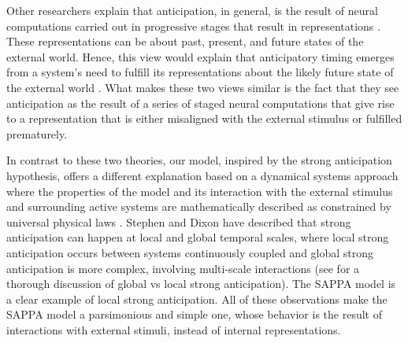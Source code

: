 \documentclass{report}
\begin{document}
Other researchers explain that anticipation, in general, is the result of neural computations carried out in progressive stages that result in representations \cite{clark2008brain}. These representations can be about past, present, and future states of the external world. Hence, this view would explain that anticipatory timing emerges from a system’s need to fulfill its representations about the likely future state of the external world \cite{pezzulo2008coordinating}. What makes these two views similar is the fact that they see anticipation as the result of a series of staged neural computations that give rise to a representation that is either misaligned with the external stimulus or fulfilled prematurely.

In contrast to these two theories, our model, inspired by the strong anticipation hypothesis, offers a different explanation based on a dynamical systems approach where the properties of the model and its interaction with the external stimulus and surrounding active systems are mathematically described as constrained by universal physical laws \cite{stepp2010strong}. Stephen and Dixon \cite{stephen2011strong} have described that strong anticipation can happen at local and global temporal scales, where local strong anticipation occurs between systems continuously coupled and global strong anticipation is more complex, involving multi-scale interactions (see \cite{mahmoodi2020dynamical, roume2018windowed} for a thorough discussion of global vs local strong anticipation). The SAPPA model is a clear example of local strong anticipation. All of these observations make the SAPPA model a parsimonious and simple one, whose behavior is the result of interactions with external stimuli, instead of internal representations.
\end{document}
